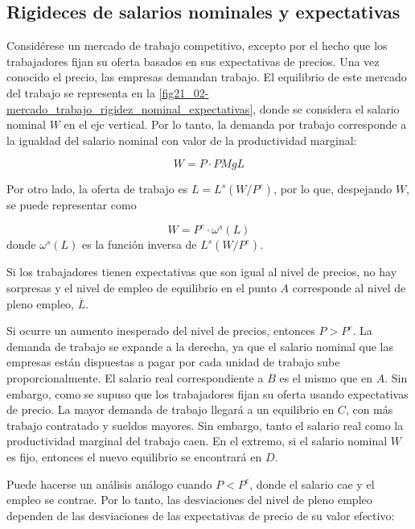 \documentclass[DeGregorioResumen]{subfiles}
\begin{document}
\subsection{Rigideces de salarios nominales y expectativas}

Considérese un mercado de trabajo competitivo, excepto por el hecho que los trabajadores fijan su oferta basados en sus expectativas de precios. Una vez conocido el precio, las empresas demandan trabajo. El equilibrio de este mercado del trabajo se representa en la \autoref{fig21_02-mercado_trabajo_rigidez_nominal_expectativas}, donde se considera el salario nominal $W$ en el eje vertical. Por lo tanto, la demanda por trabajo corresponde a la igualdad del salario nominal con valor de la productividad marginal:

\begin{equation*}
	W = P \cdot PMgL
\end{equation*}

Por otro lado, la oferta de trabajo es $L=L^s(W/P^e)$, por lo que, despejando $W$, se puede representar como

\begin{equation*}
	W = P^e \cdot \omega^s(L)
\end{equation*}
donde $\omega^s(L)$ es la función inversa de $L^s(W/P^e)$.

Si los trabajadores tienen expectativas que son igual al nivel de precios, no hay sorpresas y el nivel de empleo de equilibrio en el punto $A$ corresponde al nivel de pleno empleo, $\overline L$.



Si ocurre un aumento inesperado del nivel de precios, entonces $P>P^e$. La demanda de trabajo se expande a la derecha, ya que el salario nominal que las empresas están dispuestas a pagar por cada unidad de trabajo sube proporcionalmente.  El salario real correspondiente a $B$ es el mismo que en $A$. Sin embargo, como se supuso que los trabajadores fijan su oferta usando expectativas de precio. La mayor demanda de trabajo llegará a un equilibrio en $C$, con más trabajo contratado y sueldos mayores. Sin embargo, tanto el salario real como la productividad marginal del trabajo caen. En el extremo, si el salario nominal $W$ es fijo, entonces el nuevo equilibrio se encontrará en $D$.

Puede hacerse un análisis análogo cuando $P<P^e$, donde el salario cae y el empleo se contrae. Por lo tanto, las desviaciones del nivel de pleno empleo dependen de las desviaciones de las expectativas de precio de su valor efectivo:
\end{document}
